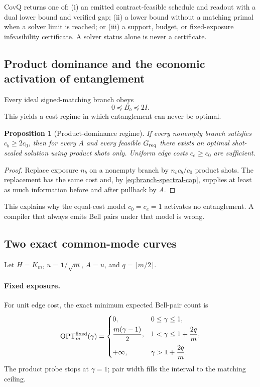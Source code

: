 \documentclass[11pt]{article}
\newtheorem{proposition}[proposition]{Proposition}
\theoremstyle{definition}
\theoremstyle{remark}
\newcommand{\ones}{\mathbf{1}}
\newcommand{\OPT}{\operatorname{OPT}}
\begin{document}
\begin{claimbox}[title={Compiler certificate interface}]
CovQ returns one of: (i) an emitted contract-feasible schedule and readout with a dual lower bound and verified gap; (ii) a lower bound without a matching primal when a solver limit is reached; or (iii) a support, budget, or fixed-exposure infeasibility certificate. A solver status alone is never a certificate.
\end{claimbox}

\subsection{Product dominance and the economic activation of entanglement}
Every ideal signed-matching branch obeys
\begin{equation}
  0\preceq B_b\preceq2I.
  \label{eq:branch-spectral-cap}
\end{equation}
This yields a cost regime in which entanglement can never be optimal.

\begin{proposition}[Product-dominance regime]
\label{prop:product-dominance}
If every nonempty branch satisfies $c_b\ge2c_0$, then for every $A$ and every feasible $G_{\rm req}$ there exists an optimal shot-scaled solution using product shots only. Uniform edge costs $c_e\ge c_0$ are sufficient.
\end{proposition}
\begin{proof}
Replace exposure $n_b$ on a nonempty branch by $n_bc_b/c_0$ product shots. The replacement has the same cost and, by \cref{eq:branch-spectral-cap}, supplies at least as much information before and after pullback by $A$.
\end{proof}
This explains why the equal-cost model $c_0=c_e=1$ activates no entanglement. A compiler that always emits Bell pairs under that model is wrong.

\subsection{Two exact common-mode curves}
Let $H=K_m$, $u=\ones/\sqrt m$, $A=u$, and $q=\lfloor m/2\rfloor$.

\paragraph{Fixed exposure.}
For unit edge cost, the exact minimum expected Bell-pair count is
\begin{equation}
\OPT^{\rm fixed}_m(\gamma)=
\begin{cases}
0,&0\le\gamma\le1,\\[1mm]
\dfrac{m(\gamma-1)}{2},&1<\gamma\le1+\dfrac{2q}{m},\\[3mm]
+\infty,&\gamma>1+\dfrac{2q}{m}.
\end{cases}
\label{eq:common-mode-curve}
\end{equation}
The product probe stops at $\gamma=1$; pair width fills the interval to the matching ceiling.
\end{document}
